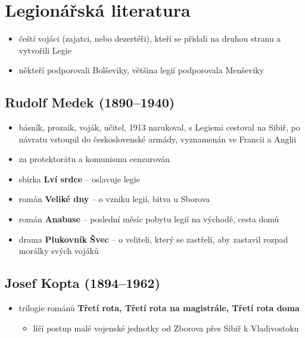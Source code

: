 \section{Legionářská literatura}
\begin{itemize}
\item čeští vojáci (zajatci, nebo dezertéři), kteří se přidali na druhou stranu a vytvořili Legie
\item někteří podporovali Bolševiky, většina legií podporovala Menševiky
\end{itemize}
\subsection{Rudolf Medek (1890--1940)}
\begin{itemize}
\item básník, prozaik, voják, učitel, 1913 narukoval, s Legiemi cestoval na Sibiř, po návratu vstoupil do československé armády, vyznamenán ve Francii a Anglii
\item za protektorátu a komunismu cenzurován
\item sbírka \textbf{Lví srdce} -- oslavuje legie
\item román \textbf{Veliké dny} -- o vzniku legií, bitva u Sborova
\item román \textbf{Anabase} -- poslední měsíc pobytu legií na východě, cesta domů
\item drama \textbf{Plukovník Švec} -- o veliteli, který se zastřelí, aby zastavil rozpad morálky svých vojáků
\end{itemize}

\subsection{Josef Kopta (1894--1962)}
\begin{itemize}
\item trilogie románů \textbf{Třetí rota, Třetí rota na magistrále, Třetí rota doma}
	\begin{itemize}
	\item líčí postup malé vojenské jednotky od Zborova přes Sibiř k Vladivostoku
	\end{itemize}
\end{itemize}

